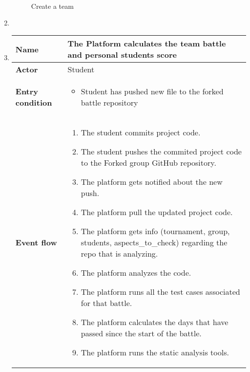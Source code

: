 \begin{enumerate}[label=\textbf{UC\arabic*}:,leftmargin=1.3cm]
          \begin{figure}[H]
              \centering
              \caption{Create a team}
              \label{fig:Create a team}
          \end{figure}
          \pagebreak
    \item
    \item \textbf{}
          \begin{table}[H]
              \centering
              \begin{tabular}{|l|p{11.9cm}|}
                  \hline
                  \textbf{Name}            & The Platform calculates the team battle and personal students score                    \\\hline
                  \textbf{Actor}           & Student                                                                               \\\hline
                  \textbf{Entry condition} &
                  \begin{itemize}
                      \item Student has pushed new file to the forked battle repository
                  \end{itemize}                                                \\\hline
                  \textbf{Event flow}      &
                  \begin{enumerate}[label=\arabic*.]
                      \item The student commits project code.
                      \item The student pushes the commited project code to the Forked group GitHub repository.
                      \item The platform gets notified about the new push.
                      \item The platform pull the updated project code.
                      \item The platform gets info (tournament, group, students, aspects_to_check) regarding the repo that is analyzing.
                      \item The platform analyzes the code.
                      \item The platform runs all the test cases associated for that battle.
                      \item The platform calculates the days that have passed since the start of the battle.
                      \item The platform runs the static analysis tools.

\end{enumerate}
\end{tabular}
\end{table}
\end{enumerate}
